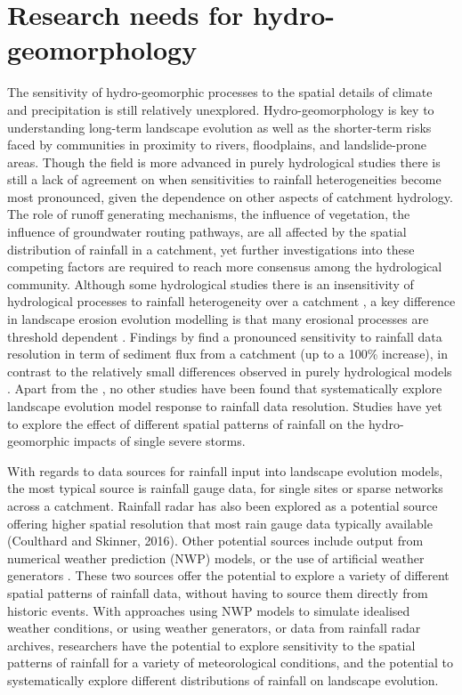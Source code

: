 \section{Research needs for hydro-geomorphology}

The sensitivity of hydro-geomorphic processes to the spatial details of climate and precipitation is still relatively unexplored. Hydro-geomorphology is key to understanding long-term landscape evolution as well as the shorter-term risks faced by communities in proximity to rivers, floodplains, and landslide-prone areas. Though the field is more advanced in purely hydrological studies \citep{krajewski1991monte,smith2005field,segond2007simulation,nicotina2008impact} there is still a lack of agreement on when sensitivities to rainfall heterogeneities become most pronounced, given the dependence on other aspects of catchment hydrology. The role of runoff generating mechanisms, the influence of vegetation, the influence of groundwater routing pathways, are all affected by the spatial distribution of rainfall in a catchment, yet further investigations into these competing factors are required to reach more consensus among the hydrological community. Although some hydrological studies there is an insensitivity of hydrological processes to rainfall heterogeneity over a catchment \citep{krajewski1991monte,smith2005field}, a key difference in landscape erosion evolution modelling is that many erosional processes are threshold dependent \citep{snyder2003importance}. Findings by \citet{coulthard2016sensitivity} find a pronounced sensitivity to rainfall data resolution in term of sediment flux from a catchment (up to a 100\% increase), in contrast to the relatively small differences observed in purely hydrological models \citep[e.g.][]{nicotina2008impact}. Apart from the \citet{coulthard2016sensitivity}, no other studies have been found that systematically explore landscape evolution model response to rainfall data resolution. Studies have yet to explore the effect of different spatial patterns of rainfall on the hydro-geomorphic impacts of single severe storms. 

With regards to data sources for rainfall input into landscape evolution models, the most typical source is rainfall gauge data, for single sites or sparse networks across a catchment. Rainfall radar has also been explored as a potential source offering higher spatial resolution that most rain gauge data typically available (Coulthard and Skinner, 2016). Other potential sources include output from numerical weather prediction (NWP) models, or the use of artificial weather generators \citep[e.g.][]{Peleg2014}. These two sources offer the potential to explore a variety of different spatial patterns of rainfall data, without having to source them directly from historic events. With approaches using NWP models to simulate idealised weather conditions, or using weather generators, or data from rainfall radar archives, researchers have the potential to explore sensitivity to the spatial patterns of rainfall for a variety of meteorological conditions, and the potential to systematically explore different distributions of rainfall on landscape evolution. 

